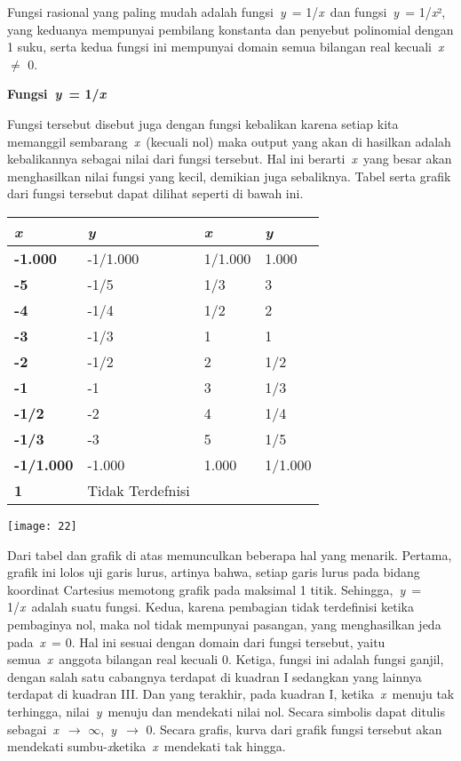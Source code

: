 \documentclass[11pt,fleqn]{book} %
\begin{document}
Fungsi rasional yang paling mudah adalah fungsi~\textit{y}~= 1/\textit{x}~dan fungsi~\textit{y}~= 1/\textit{x}², yang keduanya mempunyai pembilang konstanta dan penyebut polinomial dengan 1 suku, serta kedua fungsi ini mempunyai domain semua bilangan real kecuali~\textit{x}~$\mathrm{\neq}$ 0.

\noindent \textbf{Fungsi~\textit{y}~= 1/\textit{x}}

Fungsi tersebut disebut juga dengan fungsi kebalikan karena setiap kita memanggil sembarang~\textit{x}~(kecuali nol) maka output yang akan di hasilkan adalah kebalikannya sebagai nilai dari fungsi tersebut. Hal ini berarti~\textit{x}~yang besar akan menghasilkan nilai fungsi yang kecil, demikian juga sebaliknya. Tabel serta grafik dari fungsi tersebut dapat dilihat seperti di bawah ini.

\begin{tabular}{|p{1.1in}|p{1.1in}|p{1.1in}|p{1.1in}|} \hline 
\textbf{\textit{x}} & \textbf{\textit{y}} & \textbf{\textit{x}} & \textbf{\textit{y}} \\ \hline 
\textbf{-1.000} & -1/1.000 & 1/1.000 & 1.000 \\ \hline 
\textbf{-5} & -1/5 & 1/3 & 3 \\ \hline 
\textbf{-4} & -1/4 & 1/2 & 2 \\ \hline 
\textbf{-3} & -1/3 & 1 & 1 \\ \hline 
\textbf{-2} & -1/2 & 2 & 1/2 \\ \hline 
\textbf{-1} & -1 & 3 & 1/3 \\ \hline 
\textbf{-1/2} & -2 & 4 & 1/4 \\ \hline 
\textbf{-1/3} & -3 & 5 & 1/5 \\ \hline 
\textbf{-1/1.000} & -1.000 & 1.000 & 1/1.000 \\ \hline 
\textbf{1} & Tidak Terdefnisi &  &  \\ \hline 
\end{tabular}


\begin{center}
\texttt{[image: 22]}
\end{center}

Dari tabel dan grafik di atas memunculkan beberapa hal yang menarik. Pertama, grafik ini lolos uji garis lurus, artinya bahwa, setiap garis lurus pada bidang koordinat Cartesius memotong grafik pada maksimal 1 titik. Sehingga,~\textit{y}~= 1/\textit{x}~adalah suatu fungsi. Kedua, karena pembagian tidak terdefinisi ketika pembaginya nol, maka nol tidak mempunyai pasangan, yang menghasilkan jeda pada~\textit{x}~= 0. Hal ini sesuai dengan domain dari fungsi tersebut, yaitu semua~\textit{x}~anggota bilangan real kecuali 0. Ketiga, fungsi ini adalah fungsi ganjil, dengan salah satu cabangnya terdapat di kuadran I sedangkan yang lainnya terdapat di kuadran III. Dan yang terakhir, pada kuadran I, ketika~\textit{x}~menuju tak terhingga, nilai~\textit{y}~menuju dan mendekati nilai nol. Secara simbolis dapat ditulis sebagai~\textit{x}~$\mathrm{\to}$ $\mathrm{\infty}$,~\textit{y}~$\mathrm{\to}$ 0. Secara grafis, kurva dari grafik fungsi tersebut akan mendekati sumbu-\textit{x}ketika~\textit{x}~mendekati tak hingga.
\end{document}
